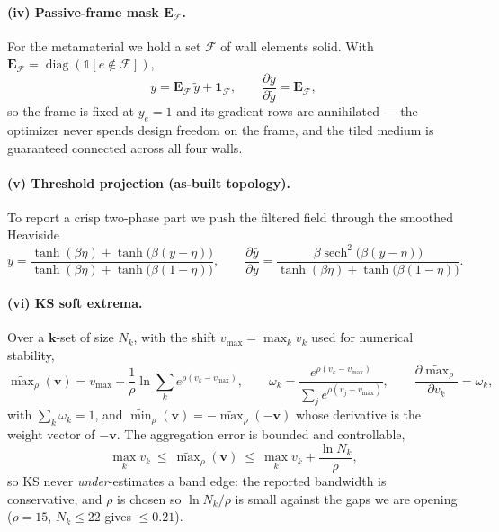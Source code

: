 \documentclass[11pt]{article}
\begin{document}
\paragraph{(iv) Passive-frame mask $\mathbf E_{\mathcal F}$.}
For the metamaterial we hold a set $\mathcal F$ of wall elements solid. With
$\mathbf E_{\mathcal F}=\operatorname{diag}(\mathbb 1[e\notin\mathcal F])$,
\begin{equation}
  y=\mathbf E_{\mathcal F}\,\tilde y+\mathbf 1_{\mathcal F},
  \qquad
  \frac{\partial y}{\partial\tilde y}=\mathbf E_{\mathcal F},
  \label{eq:passive}
\end{equation}
so the frame is fixed at $y_e=1$ and its gradient rows are annihilated --- the
optimizer never spends design freedom on the frame, and the tiled medium is
guaranteed connected across all four walls.

\paragraph{(v) Threshold projection (as-built topology).}
To report a crisp two-phase part we push the filtered field through the smoothed
Heaviside
\begin{equation}
  \bar y=\frac{\tanh(\beta\eta)+\tanh\bigl(\beta(y-\eta)\bigr)}
              {\tanh(\beta\eta)+\tanh\bigl(\beta(1-\eta)\bigr)},
  \qquad
  \frac{\partial\bar y}{\partial y}
  =\frac{\beta\operatorname{sech}^2\bigl(\beta(y-\eta)\bigr)}
        {\tanh(\beta\eta)+\tanh\bigl(\beta(1-\eta)\bigr)} .
  \label{eq:proj}
\end{equation}

\paragraph{(vi) KS soft extrema.}
Over a $\mathbf k$-set of size $N_k$, with the shift $v_{\max}=\max_k v_k$ used for
numerical stability,
\begin{equation}
  \widetilde{\max}_\rho(\mathbf v)=v_{\max}+\frac1\rho
  \ln\!\sum_k e^{\rho(v_k-v_{\max})},
  \qquad
  \omega_k=\frac{e^{\rho(v_k-v_{\max})}}{\sum_j e^{\rho(v_j-v_{\max})}},
  \qquad
  \frac{\partial\widetilde{\max}_\rho}{\partial v_k}=\omega_k,
  \label{eq:ks}
\end{equation}
with $\sum_k\omega_k=1$, and $\widetilde{\min}_\rho(\mathbf v)=
-\widetilde{\max}_\rho(-\mathbf v)$ whose derivative is the weight vector of
$-\mathbf v$. The aggregation error is bounded and controllable,
\begin{equation}
  \max_k v_k\ \le\ \widetilde{\max}_\rho(\mathbf v)\ \le\
  \max_k v_k+\frac{\ln N_k}{\rho},
  \label{eq:ksbound}
\end{equation}
so KS never \emph{under}-estimates a band edge: the reported bandwidth is
conservative, and $\rho$ is chosen so $\ln N_k/\rho$ is small against the gaps we
are opening ($\rho=15$, $N_k\le22$ gives $\le0.21$).
\end{document}

